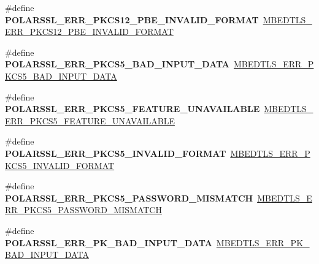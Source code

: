 \begin{DoxyCompactItemize}
\item 
\mbox{\label{compat-1_83_8h_a0ff774a9a6812532a2d116e031f2215b}} 
\#define {\bfseries P\+O\+L\+A\+R\+S\+S\+L\+\_\+\+E\+R\+R\+\_\+\+P\+K\+C\+S12\+\_\+\+P\+B\+E\+\_\+\+I\+N\+V\+A\+L\+I\+D\+\_\+\+F\+O\+R\+M\+AT}~\mbox{\hyperlink{pkcs12_8h_a92e9101410d452e508c88a7231e23996}{M\+B\+E\+D\+T\+L\+S\+\_\+\+E\+R\+R\+\_\+\+P\+K\+C\+S12\+\_\+\+P\+B\+E\+\_\+\+I\+N\+V\+A\+L\+I\+D\+\_\+\+F\+O\+R\+M\+AT}}
\item 
\mbox{\label{compat-1_83_8h_a5779c8b6dc1e1046e852baf10d54dc2b}} 
\#define {\bfseries P\+O\+L\+A\+R\+S\+S\+L\+\_\+\+E\+R\+R\+\_\+\+P\+K\+C\+S5\+\_\+\+B\+A\+D\+\_\+\+I\+N\+P\+U\+T\+\_\+\+D\+A\+TA}~\mbox{\hyperlink{pkcs5_8h_a12ca62fa36fecf6a6d9d9218601255f7}{M\+B\+E\+D\+T\+L\+S\+\_\+\+E\+R\+R\+\_\+\+P\+K\+C\+S5\+\_\+\+B\+A\+D\+\_\+\+I\+N\+P\+U\+T\+\_\+\+D\+A\+TA}}
\item 
\mbox{\label{compat-1_83_8h_ae557a501636e406bb37ed5f2c5fd8017}} 
\#define {\bfseries P\+O\+L\+A\+R\+S\+S\+L\+\_\+\+E\+R\+R\+\_\+\+P\+K\+C\+S5\+\_\+\+F\+E\+A\+T\+U\+R\+E\+\_\+\+U\+N\+A\+V\+A\+I\+L\+A\+B\+LE}~\mbox{\hyperlink{pkcs5_8h_a2162372c89339c4a6da1b9d01e08ee90}{M\+B\+E\+D\+T\+L\+S\+\_\+\+E\+R\+R\+\_\+\+P\+K\+C\+S5\+\_\+\+F\+E\+A\+T\+U\+R\+E\+\_\+\+U\+N\+A\+V\+A\+I\+L\+A\+B\+LE}}
\item 
\mbox{\label{compat-1_83_8h_a483cc034a7a2bc96ae1082a89d53c98d}} 
\#define {\bfseries P\+O\+L\+A\+R\+S\+S\+L\+\_\+\+E\+R\+R\+\_\+\+P\+K\+C\+S5\+\_\+\+I\+N\+V\+A\+L\+I\+D\+\_\+\+F\+O\+R\+M\+AT}~\mbox{\hyperlink{pkcs5_8h_ab1258962a0e536ca372ee144565f108a}{M\+B\+E\+D\+T\+L\+S\+\_\+\+E\+R\+R\+\_\+\+P\+K\+C\+S5\+\_\+\+I\+N\+V\+A\+L\+I\+D\+\_\+\+F\+O\+R\+M\+AT}}
\item 
\mbox{\label{compat-1_83_8h_a132ddd530ab43fa4d83923807b389f4a}} 
\#define {\bfseries P\+O\+L\+A\+R\+S\+S\+L\+\_\+\+E\+R\+R\+\_\+\+P\+K\+C\+S5\+\_\+\+P\+A\+S\+S\+W\+O\+R\+D\+\_\+\+M\+I\+S\+M\+A\+T\+CH}~\mbox{\hyperlink{pkcs5_8h_adb5b742465ef7f4fb9f282880ceecfeb}{M\+B\+E\+D\+T\+L\+S\+\_\+\+E\+R\+R\+\_\+\+P\+K\+C\+S5\+\_\+\+P\+A\+S\+S\+W\+O\+R\+D\+\_\+\+M\+I\+S\+M\+A\+T\+CH}}
\item 
\mbox{\label{compat-1_83_8h_af53e57b17f7ca55022d3b639ad0ba722}} 
\#define {\bfseries P\+O\+L\+A\+R\+S\+S\+L\+\_\+\+E\+R\+R\+\_\+\+P\+K\+\_\+\+B\+A\+D\+\_\+\+I\+N\+P\+U\+T\+\_\+\+D\+A\+TA}~\mbox{\hyperlink{pk_8h_aab119ef4dc86ea6546472299a259bfe8}{M\+B\+E\+D\+T\+L\+S\+\_\+\+E\+R\+R\+\_\+\+P\+K\+\_\+\+B\+A\+D\+\_\+\+I\+N\+P\+U\+T\+\_\+\+D\+A\+TA}}

\end{DoxyCompactItemize}
